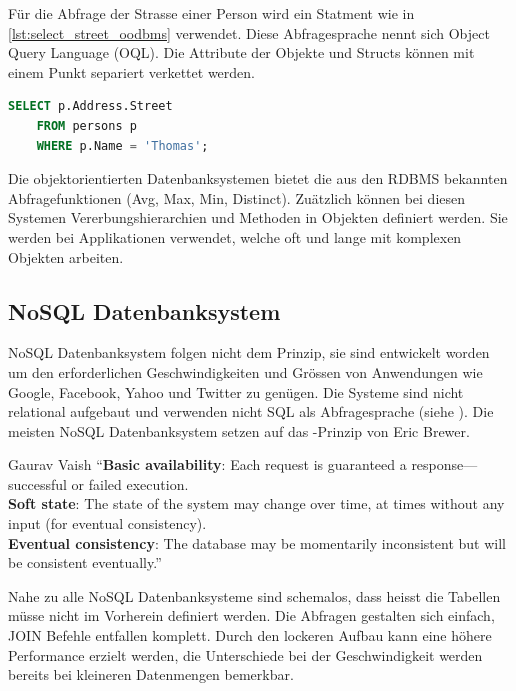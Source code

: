 Für die Abfrage der Strasse einer Person wird ein Statment wie in \autoref{lst:select_street_oodbms} verwendet. Diese Abfragesprache nennt
sich Object Query Language (OQL). Die Attribute der Objekte und Structs können mit einem Punkt separiert verkettet werden.

\begin{lstlisting}[language=SQL, caption=Abfrage in objektorientierem Datenbanksystem, label=lst:select_street_oodbms]  
    SELECT p.Address.Street
    FROM persons p
    WHERE p.Name = 'Thomas';
\end{lstlisting}

Die objektorientierten Datenbanksystemen bietet die aus den RDBMS bekannten Abfragefunktionen (Avg, Max, Min, Distinct). 
Zuätzlich können bei diesen Systemen Vererbungshierarchien und Methoden in Objekten definiert werden. Sie werden bei Applikationen verwendet,
welche oft und lange mit komplexen Objekten arbeiten.

\subsection{NoSQL Datenbanksystem}\label{no_sql_db}
NoSQL Datenbanksystem folgen nicht dem  Prinzip, sie sind entwickelt worden um den erforderlichen Geschwindigkeiten und Grössen von Anwendungen wie Google, 
Facebook, Yahoo und Twitter zu genügen. Die Systeme sind nicht relational aufgebaut und verwenden nicht SQL als Abfragesprache (siehe \cite{vaish2013getting}). 
Die meisten NoSQL Datenbanksystem setzen auf das -Prinzip von Eric Brewer.

\begin{myQuote}{Gaurav Vaish \cite{vaish2013getting}}
"`\textbf{Basic availability}: Each request is guaranteed a response—successful or failed execution.\\
\textbf{Soft state}: The state of the system may change over time, at times without any input (for eventual consistency).\\
\textbf{Eventual consistency}: The database may be momentarily inconsistent but will be consistent eventually."'
\end{myQuote}

Nahe zu alle NoSQL Datenbanksysteme sind schemalos, dass heisst die Tabellen müsse nicht im Vorherein definiert werden. Die Abfragen gestalten sich einfach, JOIN Befehle entfallen 
komplett. Durch den lockeren Aufbau kann eine höhere Performance erzielt werden, die Unterschiede bei der Geschwindigkeit werden bereits bei kleineren Datenmengen bemerkbar.

